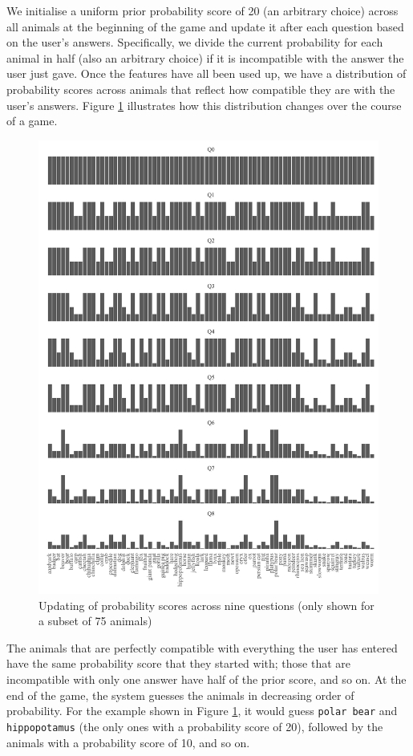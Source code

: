 \documentclass[11pt,a4paper]{article}
\begin{document}
{We initialise a uniform prior probability score of 20 (an arbitrary choice) across all animals at the beginning of the game and update it after each question based on the user's answers.
Specifically, we divide the current probability for each animal in half (also an arbitrary choice) if it is incompatible with the answer the user just gave.
Once the features have all been used up, we have a distribution of probability scores across animals that reflect how compatible they are with the user's answers.
Figure \ref{fig:bayesian-update} illustrates how this distribution changes over the course of a game.

\begin{figure}
	\includegraphics[width=\linewidth]{graphics/updating.pdf}
	\caption{Updating of probability scores across nine questions (only shown for a subset of 75 animals)}
	\label{fig:bayesian-update}
\end{figure}

The animals that are perfectly compatible with everything the user has entered have the same probability score that they started with; those that are incompatible with only one answer have half of the prior score, and so on.
At the end of the game, the system guesses the animals in decreasing order of probability.
For the example shown in Figure \ref{fig:bayesian-update}, it would guess \texttt{polar bear} and \texttt{hippopotamus} (the only ones with a probability score of 20), followed by the animals with a probability score of 10, and so on.

}
\end{document}
